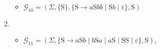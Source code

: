 \begin{enumerate}
\begin{itemize}
			\item $\mathcal{G}_{10} = (\Sigma, \{\mathrm{S}\}, \{\mathrm{S} \to a \mathrm{S} bb  \mid \mathrm{S} b  \mid \varepsilon\}, \mathrm{S})$
		\end{itemize}
	\item
		\begin{itemize}
			\item $\mathcal{G}_{11} = (\Sigma, \{\mathrm{S} \to a \mathrm{S} b  \mid b \mathrm{S} a \mid a \mathrm{S} \mid \mathrm{SS}  \mid \varepsilon\}, \mathrm{S})$,
		\end{itemize}
\end{enumerate}
